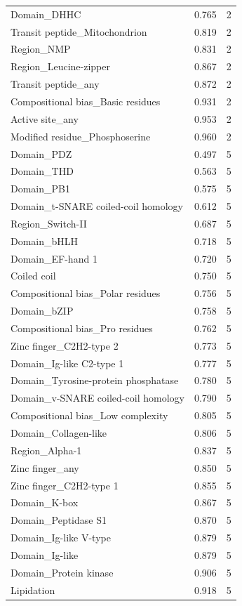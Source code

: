 \documentclass{article}
\begin{document}
\begin{longtable}{p{6.8cm}rp{2.0cm}}
Domain\_DHHC & 0.765 & 2 \\
Transit peptide\_Mitochondrion & 0.819 & 2 \\
Region\_NMP & 0.831 & 2 \\
Region\_Leucine-zipper & 0.867 & 2 \\
Transit peptide\_any & 0.872 & 2 \\
Compositional bias\_Basic residues & 0.931 & 2 \\
Active site\_any & 0.953 & 2 \\
Modified residue\_Phosphoserine & 0.960 & 2 \\
Domain\_PDZ & 0.497 & 5 \\
Domain\_THD & 0.563 & 5 \\
Domain\_PB1 & 0.575 & 5 \\
Domain\_t-SNARE coiled-coil homology & 0.612 & 5 \\
Region\_Switch-II & 0.687 & 5 \\
Domain\_bHLH & 0.718 & 5 \\
Domain\_EF-hand 1 & 0.720 & 5 \\
Coiled coil & 0.750 & 5 \\
Compositional bias\_Polar residues & 0.756 & 5 \\
Domain\_bZIP & 0.758 & 5 \\
Compositional bias\_Pro residues & 0.762 & 5 \\
Zinc finger\_C2H2-type 2 & 0.773 & 5 \\
Domain\_Ig-like C2-type 1 & 0.777 & 5 \\
Domain\_Tyrosine-protein phosphatase & 0.780 & 5 \\
Domain\_v-SNARE coiled-coil homology & 0.790 & 5 \\
Compositional bias\_Low complexity & 0.805 & 5 \\
Domain\_Collagen-like & 0.806 & 5 \\
Region\_Alpha-1 & 0.837 & 5 \\
Zinc finger\_any & 0.850 & 5 \\
Zinc finger\_C2H2-type 1 & 0.855 & 5 \\
Domain\_K-box & 0.867 & 5 \\
Domain\_Peptidase S1 & 0.870 & 5 \\
Domain\_Ig-like V-type & 0.879 & 5 \\
Domain\_Ig-like & 0.879 & 5 \\
Domain\_Protein kinase & 0.906 & 5 \\
Lipidation & 0.918 & 5 \\

\end{longtable}
\end{document}

